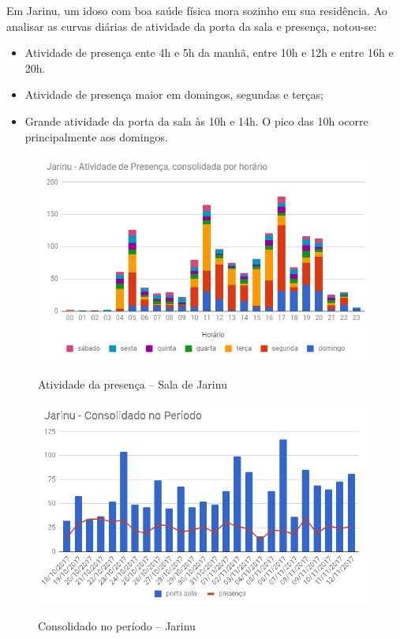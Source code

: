 Em Jarinu, um idoso com boa saúde física mora sozinho em sua residência. Ao analisar as curvas diárias de atividade da porta da sala e presença, notou-se:

\begin{itemize}
	\item Atividade de presença ente 4h e 5h da manhã, entre 10h e 12h e entre 16h e 20h.
	\item Atividade de presença maior em domingos, segundas e terças;
	\item Grande atividade da porta da sala às 10h e 14h. O pico das 10h ocorre principalmente aos domingos.
\end{itemize}

\begin{figure}[H]
	\centering
	\caption{Atividade da presença -- Sala de Jarinu}
	\includegraphics[width=1.0\textwidth]{AtivPresencaJarinu}
	\label{fig:AtivPresencaJarinu}
\end{figure}

\begin{figure}[H]
	\centering
	\caption{Consolidado no período -- Jarinu}
	\includegraphics[width=1.0\textwidth]{JarinuPeriodo}
	\label{fig:JarinuPeriodo}
\end{figure}

